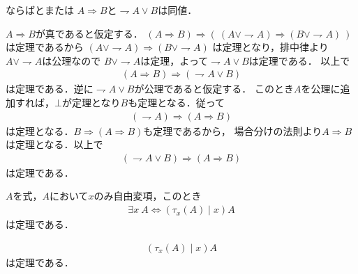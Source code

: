 	\begin{itembox}[l]{ならばとまたは}
		$A \Longrightarrow B$と$\rightharpoondown A \vee B$は同値．
	\end{itembox}
	
	\begin{prf}
		$A \Longrightarrow B$が真であると仮定する．
		$(A \Longrightarrow B) \Longrightarrow (\ (A \vee \rightharpoondown A) \Longrightarrow (B \vee \rightharpoondown A)\ )$は定理であるから
		$(A \vee \rightharpoondown A) \Longrightarrow (B \vee \rightharpoondown A)$
		は定理となり，排中律より$A \vee \rightharpoondown A$は公理なので
		$B \vee \rightharpoondown A$は定理，よって$\rightharpoondown A \vee B$は定理である．
		以上で
		\begin{align}
			(A \Longrightarrow B) \Longrightarrow (\rightharpoondown A \vee B)
		\end{align}
		は定理である．逆に$\rightharpoondown A \vee B$が公理であると仮定する．
		このとき$A$を公理に追加すれば，$\bot$が定理となり$B$も定理となる．従って
		\begin{align}
			(\rightharpoondown A) \Longrightarrow (A \Longrightarrow B)
		\end{align}
		は定理となる．$B \Longrightarrow (A \Longrightarrow B)$も定理であるから，
		場合分けの法則より$A \Longrightarrow B$は定理となる．以上で
		\begin{align}
			(\rightharpoondown A \vee B) \Longrightarrow (A \Longrightarrow B)
		\end{align}
		は定理である．
	\end{prf}
	
	\begin{screen}
		$A$を式，$A$において$x$のみ自由変項，このとき
		\begin{align}
			\exists x\ A \Longleftrightarrow \left( \tau_x(A) \mid x \right) A
		\end{align}
		は定理である．
	\end{screen}
	
	\begin{screen}
		\begin{align}
			\left( \tau_x(A) \mid x \right) A
		\end{align}
		は定理である．
	\end{screen}
